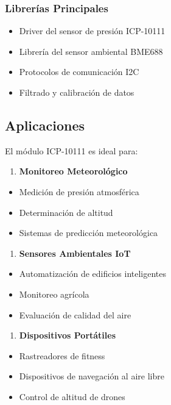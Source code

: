 \documentclass[11pt,a4paper]{article}
\begin{document}
\subsubsection{Librerías Principales}
\begin{itemize}
\item Driver del sensor de presión ICP-10111
\item Librería del sensor ambiental BME688
\item Protocolos de comunicación I2C
\item Filtrado y calibración de datos
\end{itemize}

\subsection{Aplicaciones}

El módulo ICP-10111 es ideal para:

\begin{enumerate}
\item \textbf{Monitoreo Meteorológico}
\end{enumerate}
\begin{itemize}
\item Medición de presión atmosférica
\item Determinación de altitud
\item Sistemas de predicción meteorológica
\end{itemize}

\begin{enumerate}
\item \textbf{Sensores Ambientales IoT}
\end{enumerate}
\begin{itemize}
\item Automatización de edificios inteligentes
\item Monitoreo agrícola
\item Evaluación de calidad del aire
\end{itemize}

\begin{enumerate}
\item \textbf{Dispositivos Portátiles}
\end{enumerate}
\begin{itemize}
\item Rastreadores de fitness
\item Dispositivos de navegación al aire libre
\item Control de altitud de drones
\end{itemize}
\end{document}
